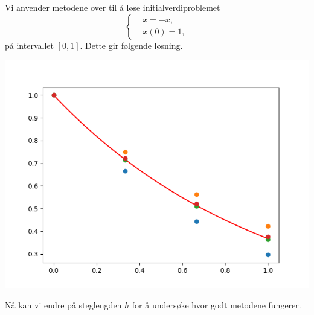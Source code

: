 \documentclass{article}
\theoremstyle{plain}
\theoremstyle{definition}
\theoremstyle{remark}
\newenvironment{ex}
{\pushQED{\qed}\renewcommand{\qedsymbol}{$\triangle$}\exx}
{\popQED\endexx}
\newcommand{\fcn}{x}
\begin{document}
\begin{ex}
    Vi anvender metodene over til å løse initialverdiproblemet
    \begin{equation*}
        \left\{ 
            \begin{aligned}
                & \dot{\fcn} = - \fcn, \\
                & \fcn(0) = 1,
            \end{aligned}
        \right.
    \end{equation*}
    på intervallet $[0, 1]$.
    Dette gir følgende løsning.
    \begin{center}
        \includegraphics[scale=0.6]{methods_test.png}
    \end{center}

    Nå kan vi endre på steglengden $h$ for å undersøke hvor godt metodene fungerer.

\end{ex}
\end{document}
